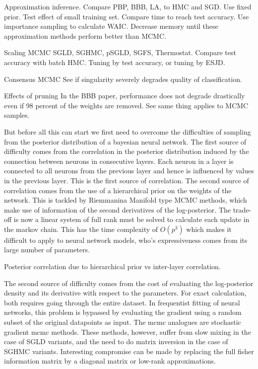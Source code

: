 \documentclass[]{report}
\begin{document}
\begin{enumerate}
Approximation inference. 
Compare PBP, BBB, LA, to HMC and SGD. Use fixed prior. Test effect of small training
set. Compare time to reach test accuracy. Use importance sampling to calculate
WAIC. Decrease memory until these approximation methods perform better than
MCMC.

Scaling MCMC
SGLD, SGHMC, pSGLD, SGFS, Thermostat. Compare test accuracy with batch HMC.
Tuning by test accuracy, or tuning by ESJD.

Consensus MCMC 
See if singularity severely degrades quality of classification.

Effects of pruning
In the BBB paper, performance does not degrade drastically even if 98 percent of
the weights are removed. See same thing applies to MCMC samples. 





But before all this can start we first need to overcome the difficulties of
sampling from the posterior distribution of a bayesian neural network. The
first source of difficulty comes from the correlation in the posterior distribution induced by
the connection between neurons in consecutive layers. Each neuron in a layer is
connected to all neurons from the previous layer and hence is influenced by
values in the previous layer. This is the first source of correlation. The
second source of correlation comes from the use of a hierarchical prior on the
weights of the network. This is tackled by Riemmanina Manifold type MCMC
methods, which make use of information of the second derivatives of the
log-posterior. The trade-off is now a linear system of full rank must be solved
to calculate each update in the markov chain. This has the time complexity of
$O(p^3)$ which makes it difficult to apply to neural network models, who's
expressiveness comes from its large number of parameters. 

Posterior correlation due to hierarchical prior vs inter-layer correlation. 

The second source of difficulty comes from the cost of evaluating the
log-posterior density and its derivative with respect to the parameters. For
exact calculation, both requires going through the entire dataset. In
frequentist fitting of neural networks, this problem is bypassed by evaluating
the gradient using a random subset of the original datapoints as input. The mcmc
analogues are stochastic gradient mcmc methods. These methods, however, suffer
from slow mixing in the case of SGLD variants, and the need to do matrix
inversion in the case of SGHMC variants. Interesting compromise can be made by
replacing the full fisher information matrix by a diagonal matrix or low-rank
approximations. 


\end{enumerate}
\end{document}
